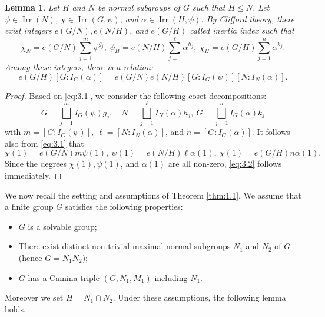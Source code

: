 \documentclass[a4paper,12pt]{article}
\newtheorem{lemma}[theorem]{Lemma}
\theoremstyle{definition}
\theoremstyle{remark}
\DeclareMathOperator{\irr}{Irr}
\numberwithin{equation}{section}
\begin{document}
\begin{lemma} \label{lem:3.1.5} 
    Let $H$ and $N$ be normal subgroups of $G$ such that $H \le N$.
    Let $\psi \in \irr (N)$, $\chi \in \irr ( G , \psi) $,
    and $\alpha \in \irr (H , \psi) $.
    By Clifford theory, there exist integers $e(G/N), e(N/H)$, and 
    $e(G/H)$ called inertia index such that 
  \begin{equation} \label{eq:3.1}
    \chi_N = e(G/N) \sum_{j=1}^m \psi^{g_j}, \ \psi_H = e(N/H) \sum_{j=1}^{\ell} \alpha^{h_j},
 \ \chi_H = e (G/H) \sum_{j=1}^n \alpha^{k_j}.
  \end{equation}
Among these integers, there is a relation:
\begin{equation} \label{eq:3.2}
e (G/H) [G: I_G (\alpha )] = e (G/N) e(N/H) [G: I_G (\psi)] [N : I_N (\alpha )].
\end{equation}
\end{lemma}
\begin{proof}
Based on \eqref{eq:3.1}, 
we consider the following coset decompositions:
    \[
    G = \bigsqcup_{j=1}^m I_G (\psi ) g_j, \quad N = \bigsqcup_{j=1}^{\ell} I_{N} (\alpha ) h_j,
    \ G= \bigsqcup_{j=1}^n I_G (\alpha ) k_j 
    \]
    with $m= [G : I_G (\psi )], \  \ell = [N : I_N (\alpha )] $, and 
    $n = [G: I_G (\alpha )]$.
It follows also from \eqref{eq:3.1} that
\begin{equation} \label{eq:3.25}
    \chi (1) = e (G/N) m \psi (1), \ \psi (1) = e (N/H) \ell \alpha (1), \ \chi (1) 
= e(G/H) n \alpha (1).
\end{equation}
Since the degrees $\chi (1), \psi (1)$, and $\alpha (1)$ are all non-zero, \eqref{eq:3.2} follows 
immediately.
\end{proof}

We now recall the setting and assumptions of Theorem \ref{thm:1.1}.
We assume that a finite group $G$ satisfies the following properties:
\begin{itemize}
    \item $G$ is a solvable group;
    \item  There exist distinct non-trivial maximal normal subgroups $N_1$
     and $N_2$ of $G$ (hence $G=N_1 N_2$);
    \item  $G$ has a Camina triple $(G,N_1, M_1)$ including $N_1$.
\end{itemize}

Moreover we set $H = N_1 \cap N_2$. 
Under these assumptions, the following lemma holds.
\end{document}

